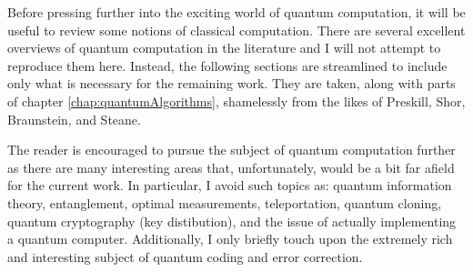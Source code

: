 Before pressing further into the exciting world of quantum computation, 
it will be useful to review some notions of classical computation.
There are several excellent overviews of quantum computation in the literature
\cite{Preskill:98,Shor:00,Braunstein:96,Steane:97,Lo/Popescu/Spiller:00,
Deutsch/Ekert/Lupacchini:99,Preskill:96}
and I will not attempt to reproduce them here.  Instead, the following
sections are streamlined to include only what is necessary for the remaining
work.  They are taken, along with parts of chapter \ref{chap:quantumAlgorithms}, 
shamelessly from the likes of Preskill\cite{Preskill:98}, Shor\cite{Shor:00}, 
Braunstein\cite{Braunstein:96}, and Steane\cite{Steane:97}.

The reader is encouraged to pursue the subject of quantum computation 
further as there are many interesting
areas that, unfortunately, would be a bit far afield for the current work.
In particular, I avoid such topics as: quantum information theory, 
entanglement, optimal measurements, teleportation, quantum cloning,
quantum cryptography (key distibution), and the issue of actually 
implementing a quantum computer.
Additionally, I only briefly touch upon the extremely rich and interesting
subject of quantum coding and error correction.  




